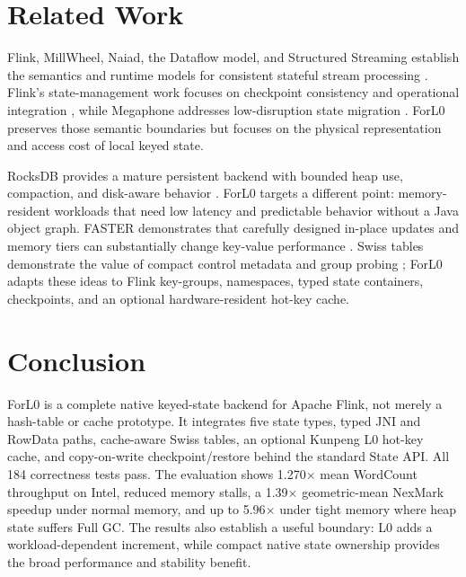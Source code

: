 \documentclass[sigconf]{acmart}
\newcommand{\forlzero}{ForL0\xspace}
\newcommand{\system}{\forlzero}
\begin{document}
\section{Related Work}

Flink, MillWheel, Naiad, the Dataflow model, and Structured Streaming establish the semantics and runtime models for consistent stateful stream processing \cite{carbone2015flink,akidau2013millwheel,murray2013naiad,akidau2015dataflow,armbrust2018structured}. Flink's state-management work focuses on checkpoint consistency and operational integration \cite{carbone2017statemanagement}, while Megaphone addresses low-disruption state migration \cite{hoffman2019megaphone}. \system preserves those semantic boundaries but focuses on the physical representation and access cost of local keyed state.

RocksDB provides a mature persistent backend with bounded heap use, compaction, and disk-aware behavior \cite{rocksdb}. \system targets a different point: memory-resident workloads that need low latency and predictable behavior without a Java object graph. FASTER demonstrates that carefully designed in-place updates and memory tiers can substantially change key-value performance \cite{chandramouli2018faster}. Swiss tables demonstrate the value of compact control metadata and group probing \cite{abseil2018swisstable}; \system adapts these ideas to Flink key-groups, namespaces, typed state containers, checkpoints, and an optional hardware-resident hot-key cache.

\section{Conclusion}

\system is a complete native keyed-state backend for Apache Flink, not merely a hash-table or cache prototype. It integrates five state types, typed JNI and RowData paths, cache-aware Swiss tables, an optional Kunpeng L0 hot-key cache, and copy-on-write checkpoint/restore behind the standard State API. All 184 correctness tests pass. The evaluation shows 1.270$\times$ mean WordCount throughput on Intel, reduced memory stalls, a 1.39$\times$ geometric-mean NexMark speedup under normal memory, and up to 5.96$\times$ under tight memory where heap state suffers Full GC. The results also establish a useful boundary: L0 adds a workload-dependent increment, while compact native state ownership provides the broad performance and stability benefit.

\balance


\end{document}
